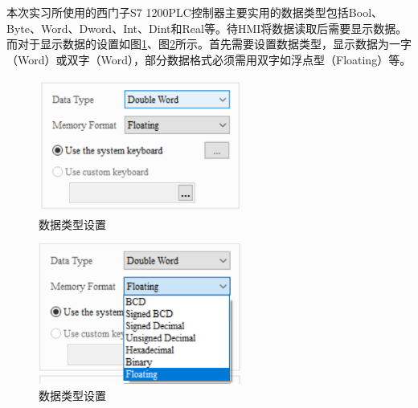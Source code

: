 \documentclass[UTF8]{article}
\begin{document}
本次实习所使用的西门子S7 1200PLC控制器主要实用的数据类型包括Bool、Byte、Word、Dword、Int、Dint和Real等。待HMI将数据读取后需要显示数据。而对于显示数据的设置如图\ref{fig:img15}、图\ref{fig:img16}所示。首先需要设置数据类型，显示数据为一字（Word）或双字（Word），部分数据格式必须需用双字如浮点型（Floating）等。
\begin{figure}[H]
    \centering %
    \includegraphics[width=0.6\textwidth]{figure/数据类型设置14.png} 
    \caption{数据类型设置} %
    \label{fig:img15} %
\end{figure}
\begin{figure}[H]
    \centering %
    \includegraphics[width=0.6\textwidth]{figure/数据类型设置15.png} 
    \caption{数据类型设置} %
    \label{fig:img16} %
\end{figure}
\end{document}
